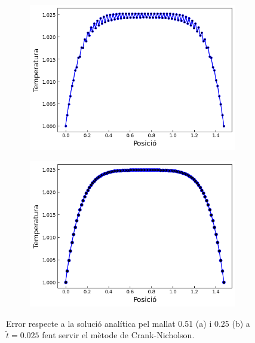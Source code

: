 \documentclass{article}
\begin{document}
\begin{figure}[h]
    \centering
    \begin{subfigure}[b]{0.35\textwidth}
        \includegraphics[width=\textwidth]{images/T_vs_z_at1.png} 
        \caption{}
        \label{fig:err_CN_at1}
    \end{subfigure}
    \hspace{1.5cm}
    \begin{subfigure}[b]{0.35\textwidth}
        \includegraphics[width=\textwidth]{images/T_vs_z_at2.png}
        \caption{} 
        \label{fig:err_CN_at2}
    \end{subfigure}
    \caption{Error respecte a la solució analítica pel mallat 0.51 (a) i 0.25 (b) a $\tilde{t}=0.025$ fent servir el mètode de Crank-Nicholson.}
    \label{fig:crank_nicholson}
\end{figure}
\end{document}
